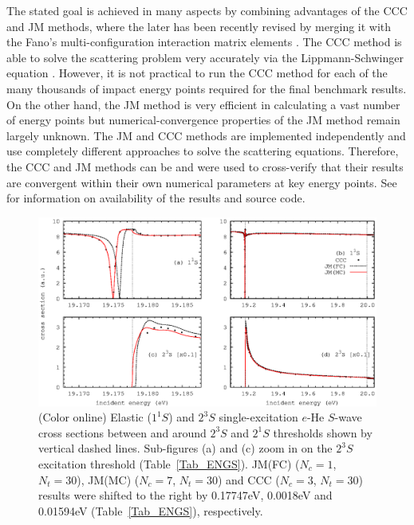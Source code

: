 \documentclass[aip
, pra
, showpacs
, aps
, twocolumn
, groupedaddress
, floatfix
]{revtex4}
\begin{document}
The stated goal is achieved in many aspects by combining advantages of the CCC and JM methods,
where the later has been recently revised \cite{KFB11} by merging it with the Fano's multi-configuration interaction matrix elements \cite{Fano65}.
The CCC method is able to solve the scattering problem very accurately via the Lippmann-Schwinger equation \cite{BS92p6995}.
However, it is not practical to run the CCC method for each of the many thousands of impact energy points required for the final benchmark results.
On the other hand, the JM method is very efficient \cite{HY74p1201,BR76p1491} in calculating a vast number of energy points
but numerical-convergence properties of the JM method remain largely unknown.
The JM and CCC methods are implemented independently and use completely different approaches to solve the scattering equations.
Therefore, the CCC and JM methods can be and were used to cross-verify that their results are convergent within their own numerical parameters at key energy points.
See \cite{JMatrixWebsite} for information on availability of the results and source code.


\begin{figure}[htb]
\includegraphics[scale=1]{fig1.ps}
\caption{(Color online) Elastic ($1^1S$) and
$2^3S$ single-excitation $e$-He $S$-wave cross sections between and around $2^3S$ and $2^1S$ thresholds shown by vertical dashed lines.
Sub-figures (a) and (c) zoom in on the $2^3S$ excitation threshold (Table~\ref{Tab_ENGS}).
JM(FC) ($N_c=1$, $N_t=30$), JM(MC) ($N_c=7$, $N_t=30$) and CCC ($N_c=3$, $N_t=30$) results  were shifted to the right by 0.17747eV, 0.0018eV
and 0.01594eV (Table~\ref{Tab_ENGS}), respectively.
}
\label{Fig_1}
\end{figure}
\end{document}
